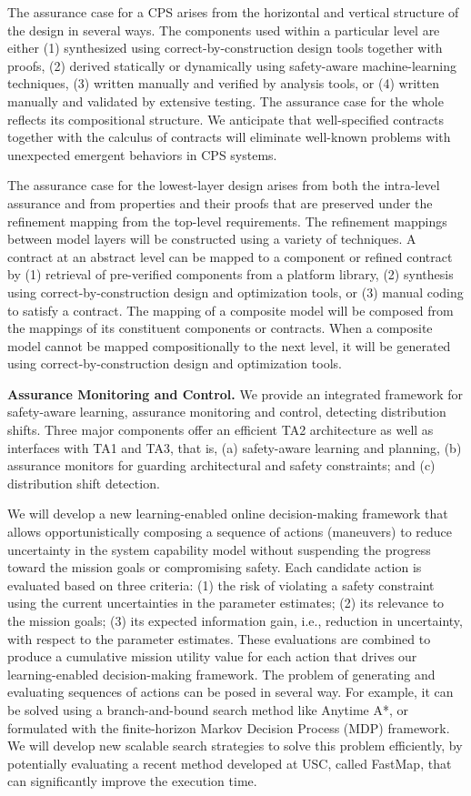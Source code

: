 \documentclass[12pt]{dod-blank}
\begin{document}
The assurance case for a CPS arises from the horizontal and vertical
structure of the design in several ways.  The components used within a
particular level are either (1) synthesized using
correct-by-construction design tools together with proofs, (2) derived
statically or dynamically using safety-aware machine-learning
techniques, (3) written manually and verified by analysis tools, or
(4) written manually and validated by extensive testing.  The
assurance case for the whole reflects its compositional structure.  We
anticipate that well-specified contracts together with the calculus of
contracts will eliminate well-known problems with unexpected emergent
behaviors in CPS systems.

The assurance case for the lowest-layer design arises from both the
intra-level assurance and from properties and their proofs that are
preserved under the refinement mapping from the top-level
requirements.  The refinement mappings between model layers will be
constructed using a variety of techniques.  A contract at an abstract
level can be mapped to a component or refined contract by (1)
retrieval of pre-verified components from a platform library, (2)
synthesis using correct-by-construction design and optimization tools,
or (3) manual coding to satisfy a contract.  The mapping of a
composite model will be composed from the mappings of its constituent
components or contracts.  When a composite model cannot be mapped
compositionally to the next level, it will be generated using
correct-by-construction design and optimization tools.

\textbf{Assurance Monitoring and Control.}
We provide an integrated framework for safety-aware learning, assurance monitoring and control, detecting distribution shifts. Three major components offer an efficient TA2 architecture as well as interfaces with TA1 and TA3, that is, (a) safety-aware learning and planning, (b) assurance monitors for guarding architectural and safety constraints; and (c) distribution shift detection.

We will develop a new learning-enabled online decision-making framework that allows opportunistically composing a sequence of actions (maneuvers) to reduce uncertainty in the system capability model without suspending the progress toward the mission goals or compromising safety. Each candidate action is evaluated based on three criteria: (1) the risk of violating a safety constraint using the current uncertainties in the parameter estimates; (2) its relevance to the mission goals; (3)  its expected information gain, i.e., reduction in uncertainty, with respect to the parameter estimates. These evaluations are combined to produce a cumulative mission utility value for each action that drives our learning-enabled decision-making framework. The problem of generating and evaluating sequences of actions can be posed in several way. For example, it can be solved using a branch-and-bound search method like Anytime A*, or formulated with the finite-horizon Markov Decision Process (MDP) framework. We will develop new scalable search strategies to solve this problem efficiently, by potentially evaluating a recent method developed at USC, called FastMap, that can significantly improve the execution time. 
\end{document}
